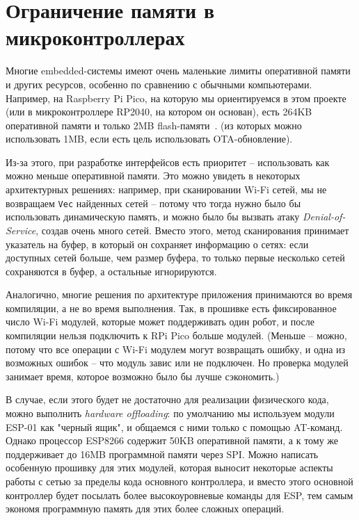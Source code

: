 \documentclass[%
]{report}
\begin{document}
\section{Ограничение памяти в микроконтроллерах}

Многие embedded-системы имеют очень маленькие лимиты оперативной
памяти и других ресурсов, особенно по сравнению с обычными компьютерами.
Например, на Raspberry Pi Pico, 
на которую мы ориентируемся в этом проекте
(или в микроконтроллере RP2040, на котором он основан),
есть 264KB оперативной памяти
и только 2MB flash-памяти~\cite{raspberrypi2021}.
(из которых можно использовать 1MB, если есть цель использовать OTA-обновление).

Из-за этого, при разработке интерфейсов есть приоритет --
использовать как можно меньше оперативной памяти.
Это можно увидеть в некоторых архитектурных решениях:
например, при сканировании Wi-Fi сетей,
мы не возвращаем \texttt{Vec} найденных сетей -- 
потому что тогда нужно было бы использовать динамическую память,
и можно было бы вызвать атаку \emph{Denial-of-Service},
создав очень много сетей.
Вместо этого, метод сканирования принимает указатель на буфер,
в который он сохраняет информацию о сетях:
если доступных сетей больше, чем размер буфера,
то только первые несколько сетей сохраняются в буфер,
а остальные игнорируются.

Аналогично, многие решения по архитектуре приложения
принимаются во время компиляции, а не во время выполнения.
Так, в прошивке есть фиксированное число Wi-Fi модулей,
которые может поддерживать один робот,
и после компиляции нельзя подключить к RPi Pico больше модулей.
(Меньше -- можно, потому что все операции с Wi-Fi модулем могут возвращать ошибку,
и одна из возможных ошибок -- что модуль завис или не подключен. Но проверка модулей
занимает время, которое возможно было бы лучше сэкономить.)

В случае, если этого будет не достаточно для реализации физического кода,
можно выполнить \emph{hardware offloading}:
по умолчанию мы используем модули ESP-01 как "черный ящик",
и общаемся с ними только с помощью AT-команд.
Однако процессор ESP8266 содержит 50KB оперативной памяти,
а к тому же поддерживает до 16MB программной памяти через SPI.
Можно написать особенную прошивку для этих модулей,
которая выносит некоторые аспекты работы с сетью
за пределы кода основного контроллера,
и вместо этого основной контроллер будет посылать более высокоуровневые
команды для ESP,
тем самым экономя программную память для этих более сложных операций.
\end{document}
